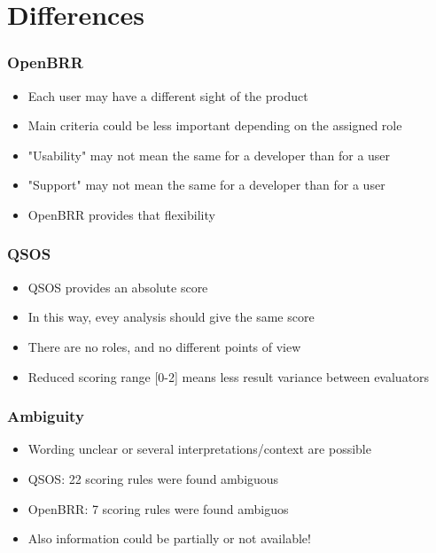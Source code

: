 \documentclass{beamer}
\begin{document}
\section{Differences}

\begin{frame}
 \frametitle{OpenBRR}
 \begin{itemize}
 \item Each user may have a different sight of the product
 \item Main criteria could be less important depending on the assigned role
 \item "Usability" may not mean the same for a developer than for a user
 \item "Support" may not mean the same for a developer than for a user
 \item OpenBRR provides that flexibility
 \end{itemize}
\end{frame}




\begin{frame}
 \frametitle{QSOS}
 \begin{itemize}
 \item QSOS provides an absolute score
 \item In this way, evey analysis should give the same score
 \item There are no roles, and no different points of view
 \item Reduced scoring range [0-2] means less result variance between evaluators
 \end{itemize}
\end{frame}


\begin{frame}
 \frametitle{Ambiguity}
 \begin{itemize}
 \item Wording unclear or several interpretations/context are possible
 \item QSOS: 22 scoring rules were found ambiguous
 \item OpenBRR: 7 scoring rules were found ambiguos
 \item Also information could be partially or not available!
 \end{itemize}
\end{frame}
\end{document}

